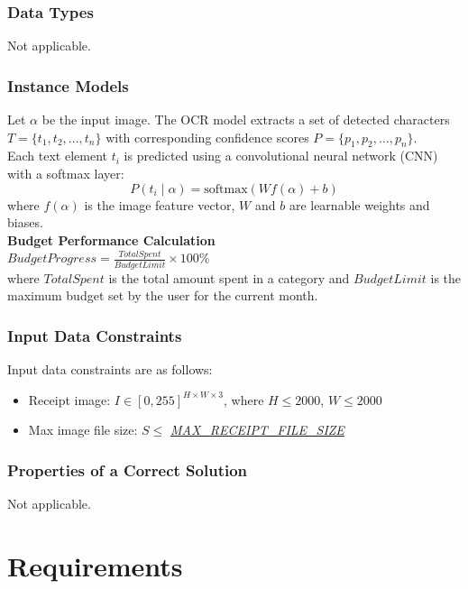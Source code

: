 \documentclass[12pt]{article}
\begin{document}
\subsubsection{Data Types}\label{sec_datatypes} Not applicable.

\subsubsection{Instance Models} \label{sec_instance}    
Let $\alpha$ be the input image. The OCR model extracts a set of detected characters $T = \{t_1, t_2, \dots, t_n\}$ with corresponding confidence scores $P = \{p_1, p_2, \dots, p_n\}$.\\
Each text element $t_i$ is predicted using a convolutional neural network (CNN) with a softmax layer:
\[
P(t_i \mid \alpha) = \text{softmax}(W f(\alpha) + b)
\]
where $f(\alpha)$ is the image feature vector, $W$ and $b$ are learnable weights and biases.\\
\textbf{Budget Performance Calculation}\\
$BudgetProgress = \frac{TotalSpent}{BudgetLimit} \times 100\%$\\
where $TotalSpent$ is the total amount spent in a category and $BudgetLimit$ is the maximum budget set by the user for the current month.

\subsubsection{Input Data Constraints} \label{sec_DataConstraints}    

Input data constraints are as follows:
\begin{itemize}
  \item Receipt image: $I \in [0, 255]^{H \times W \times 3}$, where $H \leq 2000$, $W \leq 2000$
  \item Max image file size: $S \leq$ \hyperref[Table:AuxConstants]{\textit{MAX\_RECEIPT\_FILE\_SIZE}}
\end{itemize}

\subsubsection{Properties of a Correct Solution} \label{sec_CorrectSolution} Not
applicable.


\newpage


\section{Requirements}
\end{document}
